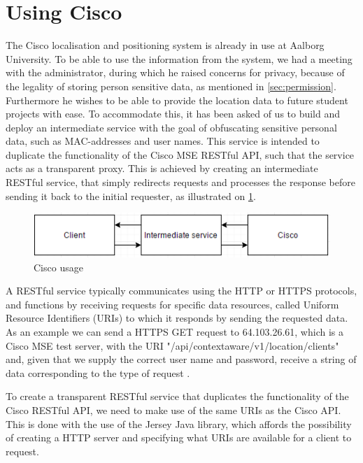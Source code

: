 \section{Using Cisco}\label{sec:cisco_usage}
The Cisco localisation and positioning system is already in use at Aalborg University. To be able to use the information from the system, we had a meeting with the administrator, during which he raised concerns for privacy, because of the legality of storing person sensitive data, as mentioned in \cref{sec:permission}. Furthermore he wishes to be able to provide the location data to future student projects with ease. To accommodate this, it has been asked of us to build and deploy an intermediate service with the goal of obfuscating sensitive personal data, such as MAC-addresses and user names. This service is intended to duplicate the functionality of the Cisco MSE RESTful API, such that the service acts as a transparent proxy. This is achieved by creating an intermediate RESTful service, that simply redirects requests and processes the response before sending it back to the initial requester, as illustrated on \cref{fig:cisco_usage}.

\begin{figure}[ht]
	\begin{center}
	\includegraphics[scale=0.9]{graphics/cisco_usage.png}
	\caption{Cisco usage}
	\label{fig:cisco_usage}
	\end{center} 
\end{figure}

A RESTful service typically communicates using the HTTP or HTTPS protocols, and functions by receiving requests for specific data resources, called Uniform Resource Identifiers (URIs) to which it responds by sending the requested data. As an example we can send a HTTPS GET request to 64.103.26.61, which is a Cisco MSE test server, with the URI "/api/contextaware/v1/location/clients" and, given that we supply the correct user name and password, receive a string of data corresponding to the type of request \cite{restful_oracle}.

To create a transparent RESTful service that duplicates the functionality of the Cisco RESTful API, we need to make use of the same URIs as the Cisco API\cite{cisco_mse_api}. This is done with the use of the Jersey Java library, which affords the possibility of creating a HTTP server and specifying what URIs are available for a client to request.

